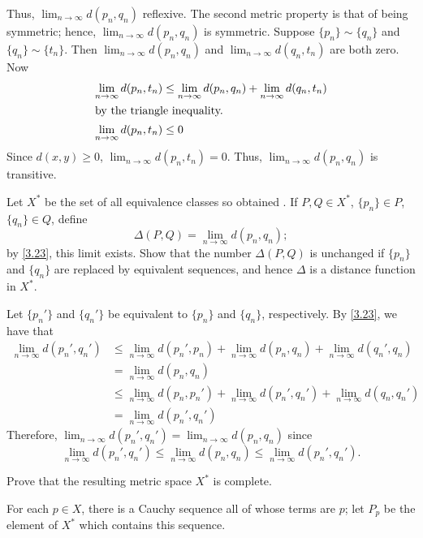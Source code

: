 \begin{exercise}
\begin{exercise}[label = (\alph*), ref = \arabic{exercisei} (\alph*)]
    Thus, \(\lim_{n\to\infty}d(p_n,q_n)\) reflexive.
    The second metric property is that of being symmetric; hence,
    \(\lim_{n\to\infty}d(p_n,q_n)\) is symmetric.
    Suppose \(\{p_n\}\sim\{q_n\}\) and \(\{q_n\}\sim\{t_n\}\).
    Then \(\lim_{n\to\infty}d(p_n,q_n)\) and \(\lim_{n\to\infty}d(q_n,t_n)\)
    are both zero.
    Now
    \begin{align*}
      \lim_{n\to\infty}d(p_n, t_n) & \leq \lim_{n\to\infty}d(p_n, q_n) +
                                     \lim_{n\to\infty}d(q_n, t_n)\\
      \intertext{by the triangle inequality.}
      \lim_{n\to\infty}d(p_n, t_n) & \leq 0
    \end{align*}
    Since \(d(x,y)\geq 0\), \(\lim_{n\to\infty}d(p_n, t_n) = 0\).
    Thus, \(\lim_{n\to\infty}d(p_n,q_n)\) is transitive.
  \item
    Let \(X^*\) be the set of all equivalence classes so obtained .
    If \(P,Q\in X^*\), \(\{p_n\}\in P\), \(\{q_n\}\in Q\), define
    \[
    \Delta(P,Q) = \lim_{n\to\infty} d(p_n, q_n);
    \]
    by \cref{3.23}, this limit exists.
    Show that the number \(\Delta(P,Q)\) is unchanged if \(\{p_n\}\) and
    \(\{q_n\}\) are replaced by equivalent sequences, and hence \(\Delta\)
    is a distance function in \(X^*\).
    \par\smallskip
    Let \(\{p_n'\}\) and \(\{q_n'\}\) be equivalent to \(\{p_n\}\) and
    \(\{q_n\}\), respectively.
    By \cref{3.23}, we have that
    \begin{align*}
      \lim_{n\to\infty}d(p_n', q_n')
      & \leq \lim_{n\to\infty}d(p_n', p_n) + \lim_{n\to\infty}d(p_n, q_n) +
        \lim_{n\to\infty}d(q_n', q_n)\\
      & = \lim_{n\to\infty}d(p_n, q_n)\\
      & \leq \lim_{n\to\infty}d(p_n, p_n') + \lim_{n\to\infty}d(p_n', q_n') +
        \lim_{n\to\infty}d(q_n, q_n')\\
      & = \lim_{n\to\infty}d(p_n', q_n')
    \end{align*}
    Therefore, \(\lim_{n\to\infty}d(p_n',q_n') = \lim_{n\to\infty}d(p_n,q_n)\)
    since
    \[
    \lim_{n\to\infty}d(p_n', q_n')\leq\lim_{n\to\infty}d(p_n, q_n)\leq
    \lim_{n\to\infty}d(p_n', q_n').
    \]
  \item
    Prove that the resulting metric space \(X^*\) is complete.
  \item
    \label{3.24d}
    For each \(p\in X\), there is a Cauchy sequence all of whose terms are
    \(p\); let \(P_p\) be the element of \(X^*\) which contains this sequence.

\end{exercise}
\end{exercise}
